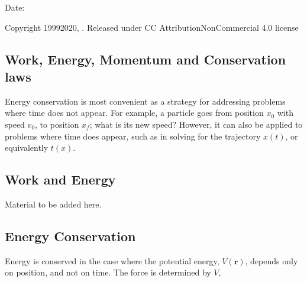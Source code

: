 \documentclass[letterpaper,10pt,english]{sphinxmanual}
\begin{document}
Date: 

Copyright 1999\sphinxhyphen{}2020, . Released under CC Attribution\sphinxhyphen{}NonCommercial 4.0 license


\subsection{Work, Energy, Momentum and Conservation laws}
\label{\detokenize{chapter3:work-energy-momentum-and-conservation-laws}}
Energy conservation is most convenient as a strategy for addressing
problems where time does not appear. For example, a particle goes
from position \(x_0\) with speed \(v_0\), to position \(x_f\); what is its
new speed? However, it can also be applied to problems where time
does appear, such as in solving for the trajectory \(x(t)\), or
equivalently \(t(x)\).


\subsection{Work and Energy}
\label{\detokenize{chapter3:work-and-energy}}
Material to be added here.


\subsection{Energy Conservation}
\label{\detokenize{chapter3:energy-conservation}}
Energy is conserved in the case where the potential energy, \(V(\boldsymbol{r})\), depends only on position, and not on time. The force is determined by \(V\),
\end{document}
